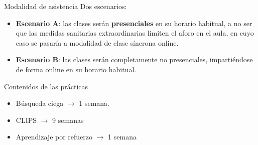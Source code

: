 \documentclass[usenames,dvipsnames,aspectratio=169]{beamer}
\begin{document}
\begin{frame}{Modalidad de asistencia}
    Dos escenarios:
    \begin{itemize}
        \item \textbf{Escenario A}: las clases serán \textbf{presenciales} en su horario habitual, a no ser que las medidas sanitarias extraordinarias limiten el aforo en el aula, en cuyo caso se pasaría a modalidad de clase síncrona online.
        
        \item \textbf{Escenario B}: las clases serán completamente no presenciales, impartiéndose de forma online en su horario habitual.
    \end{itemize}
\end{frame}

\begin{frame}{Contenidos de las prácticas}
    \begin{itemize}
        \item Búsqueda ciega $\rightarrow$ 1 semana.
        \item CLIPS $\rightarrow$ 9 semanas
        \item Aprendizaje por refuerzo $\rightarrow$ 1 semana
    \end{itemize}
\end{frame}
\end{document}
